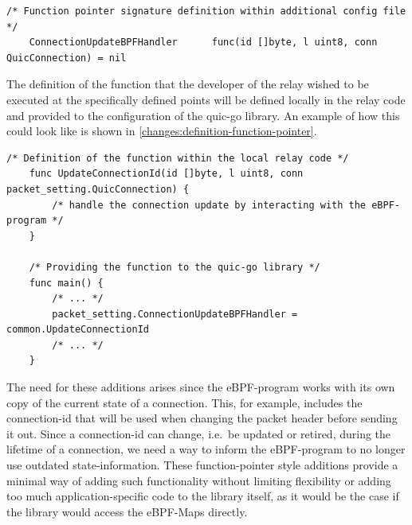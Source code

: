 \vspace{0.5cm}
\noindent\begin{minipage}{\textwidth}
\begin{lstlisting}[style=GoStyle, label=changes:signature-function-pointer, caption=Only the signature will be defined within the library itself.]
    /* Function pointer signature definition within additional config file */
	ConnectionUpdateBPFHandler      func(id []byte, l uint8, conn QuicConnection) = nil
\end{lstlisting}
\end{minipage}

The definition of the function that the developer of the relay wished to be executed at the specifically
defined points will be defined locally in the relay code and provided to the configuration of the quic-go library.
An example of how this could look like is shown in \autoref{changes:definition-function-pointer}.

\vspace{0.5cm}
\noindent\begin{minipage}{\textwidth}
\begin{lstlisting}[style=GoStyle, label=changes:definition-function-pointer, caption=An example of how the addition looks on the relay side.]
    /* Definition of the function within the local relay code */
    func UpdateConnectionId(id []byte, l uint8, conn packet_setting.QuicConnection) {
        /* handle the connection update by interacting with the eBPF-program */
    }   

    /* Providing the function to the quic-go library */
    func main() {
        /* ... */
        packet_setting.ConnectionUpdateBPFHandler = common.UpdateConnectionId
        /* ... */
    }
\end{lstlisting}
\end{minipage}

The need for these additions arises since the eBPF-program works with its own copy of the current state of a connection.
This, for example, includes the connection-id that will be used when changing the packet header before sending it out.
Since a connection-id can change, i.e.~be updated or retired, during the lifetime of a connection, we need a way to inform 
the eBPF-program to no longer use outdated state-information.
These function-pointer style additions provide a minimal way of adding such functionality without limiting flexibility 
or adding too much application-specific code to the library itself, as it would be the case if the library would access 
the eBPF-Maps directly.

